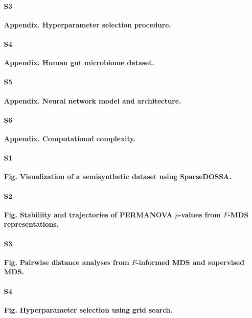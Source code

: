 \documentclass[10pt,letterpaper]{article}
\newcommand{\1}{{\rm 1}\kern-0.24em{\rm I}}
\begin{document}
\paragraph*{S3}\hspace{-2ex}
\label{sec:app3_rev}
{\bf Appendix. Hyperparameter selection procedure.}

\paragraph*{S4}\hspace{-2ex}
\label{sec:app4_rev}
{\bf Appendix. Human gut microbiome dataset.}

\paragraph*{S5}\hspace{-2ex}
\label{sec:app5_rev}
{\bf Appendix. Neural network model and architecture.}

\paragraph*{S6}\hspace{-2ex}
\label{sec:app6_rev}
{\bf Appendix. Computational complexity.}

\paragraph*{S1}\hspace{-2ex}
\label{fig:sim_data_vis}
{\bf Fig. Visualization of a semisynthetic dataset using SparseDOSSA.}

\paragraph*{S2}\hspace{-2ex}
\label{fig:sim_fmds_track}
{\bf Fig. Stabiliity and trajectories of PERMANOVA $p$-values from $F$-MDS representations.}

\paragraph*{S3}\hspace{-2ex}
\label{fig:sim_fmds_smds}
\textbf{Fig. Pairwise distance analyses from $F$-informed MDS and supervised MDS.}

\paragraph*{S4}\hspace{-2ex}
\label{fig:fmds_gridsearch}
\textbf{Fig. Hyperparameter selection using grid search.}
\end{document}
